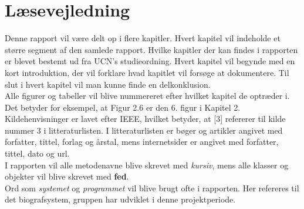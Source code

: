 \newpage
\section*{Læsevejledning}
Denne rapport vil være delt op i flere kapitler. Hvert kapitel vil indeholde et større segment af den samlede rapport.
Hvilke kapitler der kan findes i rapporten er blevet bestemt ud fra UCN's studieordning. 
Hvert kapitel vil begynde med en kort introduktion, der vil forklare hvad kapitlet vil forsøge at dokumentere. 
Til slut i hvert kapitel vil man kunne finde en delkonklusion.\\ 

Alle figurer og tabeller vil blive nummereret efter hvilket kapitel de optræder i. Det betyder for eksempel, at Figur 2.6 er den 
6. figur i Kapitel 2. \\

Kildehenvisninger er lavet efter IEEE, hvilket betyder, at [3] refererer til kilde nummer 3 i litteraturlisten. 
I litteraturlisten er bøger og artikler angivet med forfatter, tittel, forlag og årstal, mens internetsider er angivet med forfatter, tittel, dato og url. \\ 

I rapporten vil alle metodenavne blive skrevet med \textit{kursiv}, mens alle klasser og objekter vil blive skrevet med \textbf{fed}.\\

Ord som \textit{systemet} og \textit{programmet} vil blive brugt ofte i rapporten. Her refereres til det biografsystem, gruppen har udviklet i denne projektperiode.
